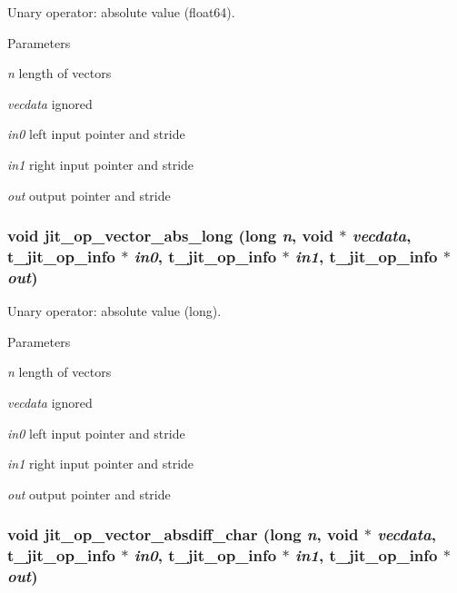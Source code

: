 Unary operator: absolute value (float64). 
\begin{DoxyParams}{Parameters}
\item[{\em n}]length of vectors \item[{\em vecdata}]ignored \item[{\em in0}]left input pointer and stride \item[{\em in1}]right input pointer and stride \item[{\em out}]output pointer and stride \end{DoxyParams}
\hypertarget{group__opvecmod_ga80b59aa6c97eabedf5e4f5973e8530ed}{
\subsubsection[{jit\_\-op\_\-vector\_\-abs\_\-long}]{\setlength{\rightskip}{0pt plus 5cm}void jit\_\-op\_\-vector\_\-abs\_\-long (long {\em n}, \/  void $\ast$ {\em vecdata}, \/  {\bf t\_\-jit\_\-op\_\-info} $\ast$ {\em in0}, \/  {\bf t\_\-jit\_\-op\_\-info} $\ast$ {\em in1}, \/  {\bf t\_\-jit\_\-op\_\-info} $\ast$ {\em out})}}
\label{group__opvecmod_ga80b59aa6c97eabedf5e4f5973e8530ed}


Unary operator: absolute value (long). 
\begin{DoxyParams}{Parameters}
\item[{\em n}]length of vectors \item[{\em vecdata}]ignored \item[{\em in0}]left input pointer and stride \item[{\em in1}]right input pointer and stride \item[{\em out}]output pointer and stride \end{DoxyParams}
\hypertarget{group__opvecmod_ga8e524cd5872ab508e3e85bade504a427}{
\subsubsection[{jit\_\-op\_\-vector\_\-absdiff\_\-char}]{\setlength{\rightskip}{0pt plus 5cm}void jit\_\-op\_\-vector\_\-absdiff\_\-char (long {\em n}, \/  void $\ast$ {\em vecdata}, \/  {\bf t\_\-jit\_\-op\_\-info} $\ast$ {\em in0}, \/  {\bf t\_\-jit\_\-op\_\-info} $\ast$ {\em in1}, \/  {\bf t\_\-jit\_\-op\_\-info} $\ast$ {\em out})}}
\label{group__opvecmod_ga8e524cd5872ab508e3e85bade504a427}


